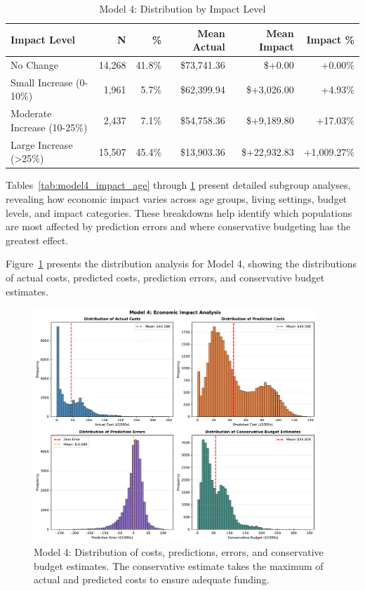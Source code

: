 \begin{table}[htbp]
\centering
\small
\caption{Model 4: Distribution by Impact Level}
\label{tab:model4_impact_distribution}
\begin{tabular}{lrrrrr}
\toprule
\textbf{Impact Level} & \textbf{N} & \textbf{\%} & \textbf{Mean Actual} & \textbf{Mean Impact} & \textbf{Impact \%} \\
\midrule
No Change & 14,268 & 41.8\% & \$73,741.36 & \$+0.00 & +0.00\% \\
Small Increase (0-10\%) & 1,961 & 5.7\% & \$62,399.94 & \$+3,026.00 & +4.93\% \\
Moderate Increase (10-25\%) & 2,437 & 7.1\% & \$54,758.36 & \$+9,189.80 & +17.03\% \\
Large Increase (>25\%) & 15,507 & 45.4\% & \$13,903.36 & \$+22,932.83 & +1,009.27\% \\
\bottomrule
\end{tabular}
\end{table}

Tables~\ref{tab:model4_impact_age} through \ref{tab:model4_impact_distribution} present detailed subgroup analyses, revealing how economic impact varies across age groups, living settings, budget levels, and impact categories. These breakdowns help identify which populations are most affected by prediction errors and where conservative budgeting has the greatest effect.

Figure~\ref{fig:model4_impact_histograms} presents the distribution analysis for Model 4, showing the distributions of actual costs, predicted costs, prediction errors, and conservative budget estimates.

\begin{figure}[htbp]
\centering
\includegraphics[width=0.95\textwidth]{figures/model_4_Impact_Histograms.pdf}
\caption{Model 4: Distribution of costs, predictions, errors, and conservative budget estimates. The conservative estimate takes the maximum of actual and predicted costs to ensure adequate funding.}
\label{fig:model4_impact_histograms}
\end{figure}

